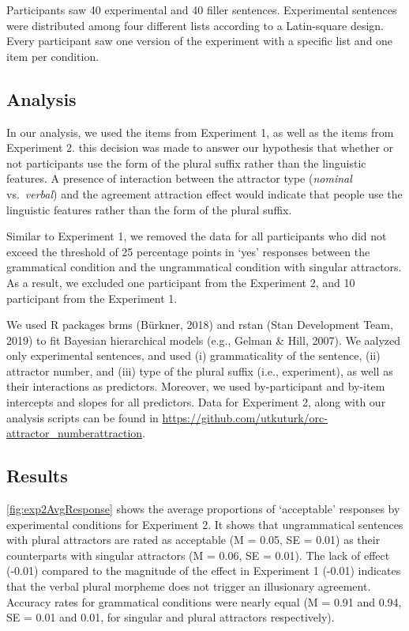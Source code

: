 \documentclass[
  english,
  doc,floatsintext]{apa6}
\begin{document}
Participants saw 40 experimental and 40 filler sentences. Experimental sentences were distributed among four different lists according to a Latin-square design. Every participant saw one version of the experiment with a specific list and one item per condition.

\hypertarget{analysis-1}{%
\subsection{Analysis}\label{analysis-1}}

In our analysis, we used the items from Experiment 1, as well as the items from Experiment 2. this decision was made to answer our hypothesis that whether or not participants use the form of the plural suffix rather than the linguistic features. A presence of interaction between the attractor type (\textit{nominal} vs.~\textit{verbal}) and the agreement attraction effect would indicate that people use the linguistic features rather than the form of the plural suffix.

Similar to Experiment 1, we removed the data for all participants who did not exceed the threshold of 25 percentage points in `yes' responses between the grammatical condition and the ungrammatical condition with singular attractors. As a result, we excluded one participant from the Experiment 2, and 10 participant from the Experiment 1.

We used R packages brms (Bürkner, 2018) and rstan (Stan Development Team, 2019) to fit Bayesian hierarchical models (e.g., Gelman \& Hill, 2007). We aalyzed only experimental sentences, and used (i) grammaticality of the sentence, (ii) attractor number, and (iii) type of the plural suffix (i.e., experiment), as well as their interactions as predictors.
Moreover, we used by-participant and by-item intercepts and slopes for all predictors.
Data for Experiment 2, along with our analysis scripts can be found in \url{https://github.com/utkuturk/orc-attractor_numberattraction}.

\hypertarget{results-1}{%
\subsection{Results}\label{results-1}}

\autoref{fig:exp2AvgResponse} shows the average proportions of `acceptable' responses by experimental conditions for Experiment 2.
It shows that ungrammatical sentences with plural attractors are rated as acceptable
(M = 0.05,
SE = 0.01)
as their counterparts with singular attractors
(M = 0.06,
SE = 0.01). The lack of effect (-0.01) compared to the magnitude of the effect in Experiment 1 (-0.01) indicates that the verbal plural morpheme does not trigger an illusionary agreement.
Accuracy rates for grammatical conditions were nearly equal
(M = 0.91 and 0.94,
SE = 0.01 and 0.01, for singular and plural attractors respectively).
\end{document}
